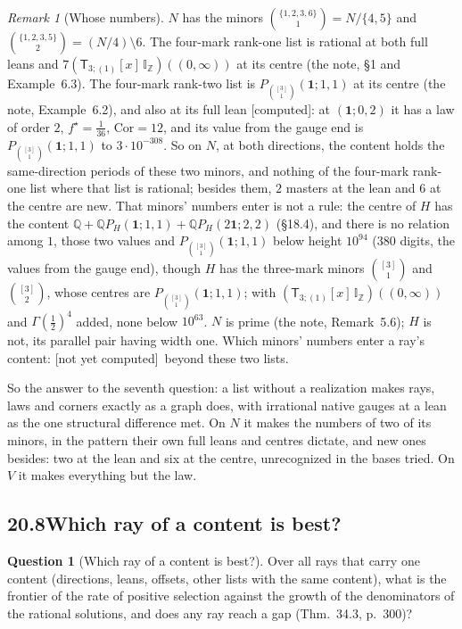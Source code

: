 \documentclass[11pt]{article}
\newcommand{\one}{\mathbf 1}
\newcommand{\sT}{\mathsf T}
\newcommand{\IZ}{\mathbb I_{\mathbb Z}}
\newcommand{\Tx}[3]{(\sT_{#1;(1)}[x]\,#2)((#3,\infty))}
\newcommand{\Pth}{P_{\binom{[3]}1}(\one;1,1)}
\newcommand{\Zt}{\Tx3{\IZ}0}
\theoremstyle{plain}
\theoremstyle{definition}
\newtheorem{question}[proposition]{Question}
\theoremstyle{remark}
\newtheorem{remark}[proposition]{Remark}
\newcommand{\computed}{\textup{[computed]}}
\newcommand{\notyet}{\textup{[not yet computed]}}
\begin{document}
\begin{remark}[Whose numbers]\label{d:r:minors}
$N$ has the minors $\binom{\{1,2,3,6\}}1=N/\{4,5\}$ and $\binom{\{1,2,3,5\}}2=(N/4)\setminus6$. The four-mark rank-one list is rational at both full leans and $7\Zt$ at its centre (the note, \S1 and Example~6.3). The four-mark rank-two list is $\Pth$ at its centre (the note, Example~6.2), and also at its full lean \computed: at $(\one;0,2)$ it has a law of order $2$, $f^\star=\frac1{36}$, $\mathrm{Cor}=12$, and its value from the gauge end is $\Pth$ to $3\cdot10^{-308}$. So on $N$, at both directions, the content holds the same-direction periods of these two minors, and nothing of the four-mark rank-one list where that list is rational; besides them, $2$ masters at the lean and $6$ at the centre are new. That minors' numbers enter is not a rule: the centre of $H$ has the content $\mathbb Q+\mathbb QP_H(\one;1,1)+\mathbb QP_H(2\one;2,2)$ (\S18.4), and there is no relation among $1$, those two values and $\Pth$ below height $10^{94}$ ($380$ digits, the values from the gauge end), though $H$ has the three-mark minors $\binom{[3]}1$ and $\binom{[3]}2$, whose centres are $\Pth$; with $\Zt$ and $\Gamma(\frac12)^4$ added, none below $10^{63}$. $N$ is prime (the note, Remark~5.6); $H$ is not, its parallel pair having width one. Which minors' numbers enter a ray's content: \notyet\ beyond these two lists.
\end{remark}

\noindent So the answer to the seventh question: a list without a realization makes rays, laws and corners exactly as a graph does, with irrational native gauges at a lean as the one structural difference met. On $N$ it makes the numbers of two of its minors, in the pattern their own full leans and centres dictate, and new ones besides: two at the lean and six at the centre, unrecognized in the bases tried. On $V$ it makes everything but the law.

\subsection*{20.8\quad Which ray of a content is best?}

\begin{question}[Which ray of a content is best?]\label{a:q:arith}
Over all rays that carry one content (directions, leans, offsets, other lists with the same content), what is the frontier of the rate of positive selection against the growth of the denominators of the rational solutions, and does any ray reach a gap (Thm.~34.3, p.~300)?
\end{question}
\end{document}
